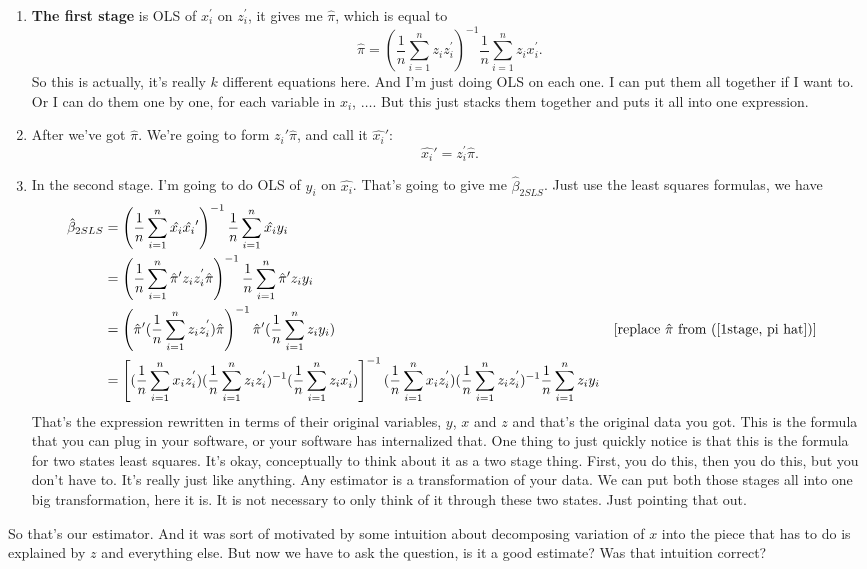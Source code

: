 \documentclass[11pt,a4paper]{amsart}
\theoremstyle{plain}
\theoremstyle{definition}
\begin{document}
	 \begin{enumerate}
	 	\item \textbf{The first stage} is OLS of $x_{i}^{'}$ on $z_{i}^{'}$, it gives me $\hat{\pi}$, which is equal to 
	 	\begin{equation}\label{1stage, pi hat}
	 		\hat{\pi} = \left(\frac{1}{n}\sum_{i=1}^{n}z_{i}z^{'}_{i}\right)^{-1} \frac{1}{n}\sum_{i=1}^{n}z_{i}x^{'}_{i}.
	 	\end{equation}
	 	So this is actually, it's really $k$ different equations here. And I'm just doing OLS on each one. I can put them all together if I want to. Or I can do them one by one, for each variable in $x_{i}$, $\dots$. But this just stacks them together and puts it all into one expression. 
	 	\item After we've got $\hat{\pi}$. We're going to form $z_{i}' \hat{\pi}$, and call it $\hat{x_{i}}'$:
	 	\[	\hat{x_{i}}' = z_{i}^{'} \hat{\pi}.	\] 
	 	\item In the second stage. I'm going to do OLS of $y_{i}$ on $\hat{x_{i}}$. That's going to give me $\hat{\beta}_{2SLS}$. Just use the least squares formulas, we have
	 	\[	\begin{aligned}
		 	\hat{\beta}_{2SLS} 	&=\left(\frac{1}{n}\sum_{i=1}^{n}\hat{x_{i}}\hat{x_{i}}'\right)^{-1}\frac{1}{n}\sum_{i=1}^{n}\hat{x_{i}}y_{i} \\
		 	&= \left(\frac{1}{n}\sum_{i=1}^{n}\hat{\pi}'z_{i} z_{i}^{'} \hat{\pi}\right)^{-1}\frac{1}{n}\sum_{i=1}^{n}\hat{\pi}'z_{i}y_{i} \\
		 	&=  \left(\hat{\pi}'(\frac{1}{n}\sum_{i=1}^{n}z_{i} z_{i}^{'}) \hat{\pi}\right)^{-1}\hat{\pi}'(\frac{1}{n}\sum_{i=1}^{n}z_{i}y_{i}) &&\text{[replace  $ \hat{\pi}$ from (\ref{1stage, pi hat})]} \\
		 	&= \left[(\frac{1}{n}\sum_{i=1}^{n}x_{i}z^{'}_{i})(\frac{1}{n}\sum_{i=1}^{n}z_{i}z^{'}_{i})^{-1}(\frac{1}{n}\sum_{i=1}^{n}z_{i}x^{'}_{i})\right]^{-1} (\frac{1}{n}\sum_{i=1}^{n}x_{i}z^{'}_{i})(\frac{1}{n}\sum_{i=1}^{n}z_{i}z^{'}_{i})^{-1}\frac{1}{n}\sum_{i=1}^{n}z_{i}y_{i}
	 	\end{aligned}
	 	\]
	 	That's the expression rewritten in terms of their original variables, $y$, $x$ and $z$ and that's the original data you got. This is the formula that you can plug in your software, or your software has internalized that. One thing to just quickly notice is that this is the formula for two states least squares. It's okay, conceptually to think about it as a two stage thing. First, you do this, then you do this, but you don't have to.  It's really just like anything. Any estimator is a transformation of your data. We can put both those stages all into one big transformation, here it is. It is not necessary to only think of it through these two states. Just pointing that out. 
	 \end{enumerate}
 		So that's our estimator. And it was sort of motivated by some intuition about decomposing variation of $x$ into the piece that has to do is explained by $z$ and everything else.  But now we have to ask the question, is it a good estimate? Was that intuition correct? 
\end{document}
